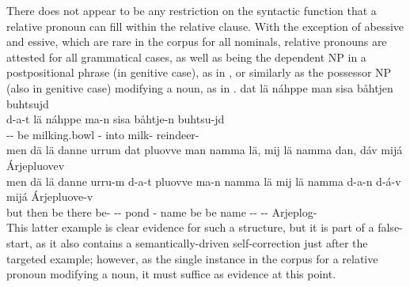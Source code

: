 There does not appear to be any restriction on the syntactic function that a relative pronoun can fill within the relative clause. With the exception of abessive and essive, which are rare in the corpus for all nominals, relative pronouns are attested for all grammatical cases, as well as being the dependent NP in a postpositional phrase (in genitive case), as in , or similarly as the possessor NP (also in genitive case) modifying a noun, as in . 
\ea\label{relClause7}%
\glll	dat lä náhppe man sisa båhtjen buhtsujd\\
	d-a-t lä náhppe ma-n sisa båhtje-n buhtsu-jd\\
	-- be\BS{} milking.bowl\BS{} - into milk- reindeer-\\\nopagebreak
{} 
\z
\ea\label{relClause8}%
\glll	men dä lä danne urrum dat pluovve man namma lä, mij lä namma dan, dáv mijá Árjepluovev\\
	men dä lä danne urru-m d-a-t pluovve ma-n namma lä mij lä namma d-a-n d-á-v mijá Árjepluove-v\\
	but then be\BS{} there be- -- pond\BS{} - name\BS{} be\BS{} \BS{} be\BS{} name\BS{} -- --  Arjeplog-\\\nopagebreak
{} 
\z
This latter example is clear evidence for such a structure, but it is part of a false-start, as it also contains a semantically-driven self-correction just after the targeted example; however, as the single instance in the corpus for a relative pronoun modifying a noun, it must suffice as evidence at this point. %

